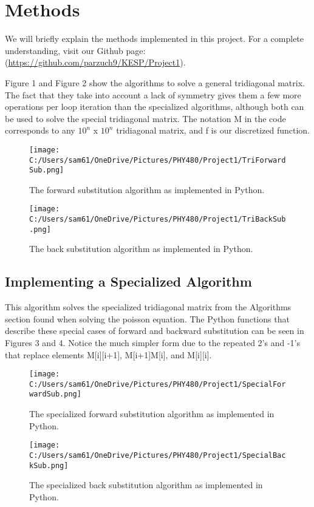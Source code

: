\documentclass[10pt,showpacs,preprintnumbers,footinbib,amsmath,amssymb,aps,prl,twocolumn,groupedaddress,superscriptaddress,showkeys]{revtex4-1}
\begin{document}
\section{Methods}

We will briefly explain the methods implemented in this project. For a complete understanding, visit our Github page: (\url{https://github.com/parzuch9/KESP/Project1}).

Figure 1 and Figure 2 show the algorithms to solve a general tridiagonal matrix. The fact that they take into account a lack of symmetry gives them a few more operations per loop iteration than the specialized algorithms, although both can be used to solve the special tridiagonal matrix. The notation M in the code corresponds to any $10^{n}$ x $10^{n}$ tridiagonal matrix, and f is our discretized function.

\begin{figure}[!ht]
	\centering
	\texttt{[image: C:/Users/sam61/OneDrive/Pictures/PHY480/Project1/TriForwardSub.png]}
	\caption{ The forward substitution algorithm as implemented in Python.  }
\end{figure}

\begin{figure}[!ht]
	\centering
	\texttt{[image: C:/Users/sam61/OneDrive/Pictures/PHY480/Project1/TriBackSub.png]}
	\caption{ The back substitution algorithm as implemented in Python.  }
\end{figure}

	\subsection{Implementing a Specialized Algorithm}
This algorithm solves the specialized tridiagonal matrix from the Algorithms section found when solving the poisson equation. The Python functions that describe these special cases of forward and backward substitution can be seen in Figures 3 and 4. Notice the much simpler form due to the repeated 2's and -1's that replace elements M[i][i+1], M[i+1]M[i], and M[i][i].

\begin{figure}[!ht]
	\centering
	\texttt{[image: C:/Users/sam61/OneDrive/Pictures/PHY480/Project1/SpecialForwardSub.png]}
	\caption{ The specialized forward substitution algorithm as implemented in Python.  }
\end{figure}

\begin{figure}[!ht]
	\centering
	\texttt{[image: C:/Users/sam61/OneDrive/Pictures/PHY480/Project1/SpecialBackSub.png]}
	\caption{ The specialized back substitution algorithm as implemented in Python.  }
\end{figure}
\end{document}
